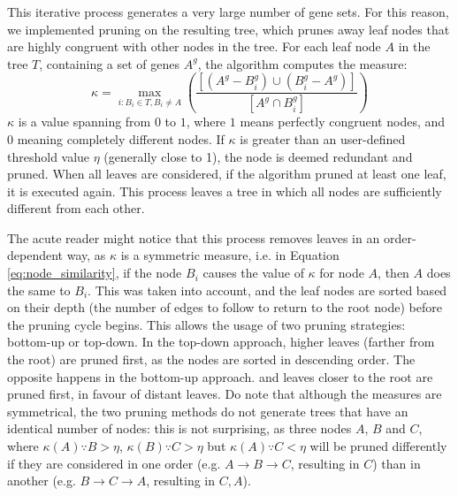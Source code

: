 This iterative process generates a very large number of gene sets. %
For this reason, we implemented pruning on the resulting tree, which prunes away leaf nodes that are highly congruent with other nodes in the tree. For each leaf node $A$ in the tree $T$, containing a set of genes $A^g$, the algorithm computes the measure:
\begin{equation}
    \kappa = \max_{i:B_i \in T, B_i \ne A}\left(\frac{[(A^g - B_i^g) \cup (B_i^g - A^g)]}{[A^g \cap B_i^g]}\right)
    \label{eq:node_similarity}
\end{equation}
$\kappa$ is a value spanning from $0$ to $1$, where $1$ means perfectly congruent nodes, and $0$ meaning completely different nodes. If $\kappa$ is greater than an user-defined threshold value $\eta$ (generally close to 1), %
the node is deemed redundant and pruned. When all leaves are considered, if the algorithm pruned at least one leaf, it is executed again. This process leaves a tree in which all nodes are sufficiently different from each other.

The acute reader might notice that this process removes leaves in an order-dependent way, as $\kappa$ is a symmetric measure, i.e. in Equation \ref{eq:node_similarity}, if the node $B_i$ causes the value of $\kappa$ for node $A$, then $A$ does the same to $B_i$. %
This was taken into account, and the leaf nodes are sorted based on their depth (the number of edges to follow to return to the root node) before the pruning cycle begins. This allows the usage of two pruning strategies: bottom-up or top-down. In the top-down approach, higher leaves (farther from the root) are pruned first, as the nodes are sorted in descending order. The opposite happens in the bottom-up approach. and leaves closer to the root are pruned first, in favour of distant leaves.
Do note that although the measures are symmetrical, the two pruning methods do not generate trees that have an identical number of nodes: this is not surprising, as three nodes $A$, $B$ and $C$, where $\kappa(A) \because B > \eta$, $\kappa(B) \because C > \eta$ but $\kappa(A)  \because C < \eta$ will be pruned differently if they are considered in one order (e.g. $A \rightarrow B \rightarrow C$, resulting in $C$) than in another (e.g. $B \rightarrow C \rightarrow A$, resulting in $C, A$).


